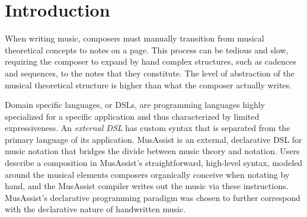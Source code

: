 \documentclass{article}
\title{\papertitle}
\begin{document}
%
\capstartfalse
\maketitle
\capstarttrue
%
\begin{abstract}
MusAssist is an external, declarative domain specific language for music notation that bridges the abstraction gap between music theory and composition. Users can describe complex musical 
templates for all triads and seventh chords, 
all diatonic as well as chromatic and whole tone scales, the five primary cadences (including imperfect authentic), 
and the four primary harmonic sequences with desired length. Uniquely, the level of abstraction of a template 
MusAssist matches that of the theoretical musical structure it describes (e.g. users can specify
 a harmonic sequence without manually lowering the granularity to chords and notes). Thus, users can write out specifications precisely at the conceptual levels of the musical theoretical structures 
 they would organically conceive when composing by hand. In MusAssist, users can also change key signatures, 
 start a new measure, and describe fundamental musical objects such as notes, rests, and chords comprised of 
 custom collections of notes. A musical expression described by a higher level template is expanded out 
 (i.e. the level of abstraction is fully lowered to notes) by the 
 Haskell-based MusAssist compiler and is finally translated to MusicXML, a language accepted by most 
 major music notation software, for further manual editing. 
\end{abstract}


\section{Introduction}\label{sec:introduction}
When writing music, composers must manually transition from musical theoretical concepts to notes on a page.
This process can be tedious and slow, requiring the composer to expand by hand complex structures, such as cadences and sequences,
to the notes that they constitute. The level of abstraction of the musical theoretical structure is 
higher than what the composer actually writes. 

Domain specific languages, or DSLs, 
are programming languages highly specialized for a specific application and thus characterized by limited expressiveness.
An \textit{external DSL} has custom syntax that is separated from the primary language of its application. 
MusAssist is an external, declarative DSL for music notation that bridges the divide between
music theory and notation. Users describe a composition in MusAssist's straightforward, high-level syntax, modeled
around the musical elements composers organically conceive when notating by hand, and the MusAssist compiler writes out the music via these instructions. MusAssist's declarative programming paradigm was chosen to further correspond with the declarative nature of handwritten music. 
\end{document}
